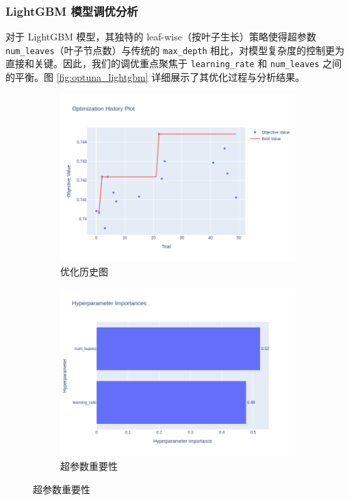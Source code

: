 \documentclass{thuemp}
\begin{document}
\subsubsection{LightGBM 模型调优分析}

对于 LightGBM 模型，其独特的 leaf-wise（按叶子生长）策略使得超参数 \texttt{num\_leaves}（叶子节点数）与传统的 \texttt{max\_depth} 相比，对模型复杂度的控制更为直接和关键。因此，我们的调优重点聚焦于 \texttt{learning\_rate} 和 \texttt{num\_leaves} 之间的平衡。图 \ref{fig:optuna_lightgbm} 详细展示了其优化过程与分析结果。

\begin{figure}[H]
    \centering
    \begin{subfigure}[b]{0.49\textwidth}
        \centering
        \includegraphics[width=\textwidth]{image/results/lightgbm_optimization_history.png} %
        \caption{优化历史图}
        \label{fig:lgb_history}
    \end{subfigure}
    \hfill
    \begin{subfigure}[b]{0.49\textwidth}
        \centering
        \includegraphics[width=\textwidth]{image/results/lightgbm_param_importance.png} %
        \caption{超参数重要性}
        \label{fig:lgb_importance}
    \end{subfigure}
    

\end{figure}
\end{document}
